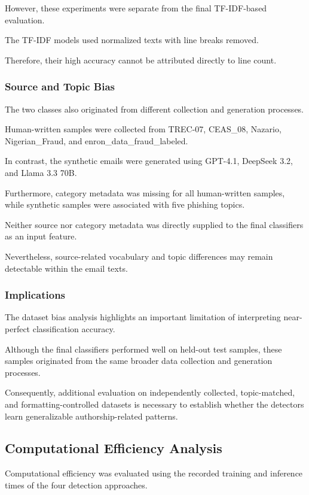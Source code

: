 \documentclass[sigconf,nonacm]{acmart}
\begin{document}
However, these experiments were separate
from the final TF-IDF-based evaluation.

The TF-IDF models used normalized texts
with line breaks removed.

Therefore, their high accuracy cannot
be attributed directly to line count.

\subsubsection{Source and Topic Bias}

The two classes also originated from
different collection and generation
processes.

Human-written samples were collected
from TREC-07, CEAS\_08, Nazario,
Nigerian\_Fraud, and
enron\_data\_fraud\_labeled.

In contrast, the synthetic emails were
generated using GPT-4.1, DeepSeek 3.2,
and Llama 3.3 70B.

Furthermore, category metadata was missing
for all human-written samples, while
synthetic samples were associated with
five phishing topics.

Neither source nor category metadata
was directly supplied to the final
classifiers as an input feature.

Nevertheless, source-related vocabulary
and topic differences may remain
detectable within the email texts.

\subsubsection{Implications}

The dataset bias analysis highlights
an important limitation of interpreting
near-perfect classification accuracy.

Although the final classifiers performed
well on held-out test samples, these
samples originated from the same broader
data collection and generation processes.

Consequently, additional evaluation on
independently collected, topic-matched,
and formatting-controlled datasets is
necessary to establish whether the
detectors learn generalizable
authorship-related patterns.

\subsection{Computational Efficiency Analysis}

Computational efficiency was evaluated
using the recorded training and inference
times of the four detection approaches.
\end{document}
